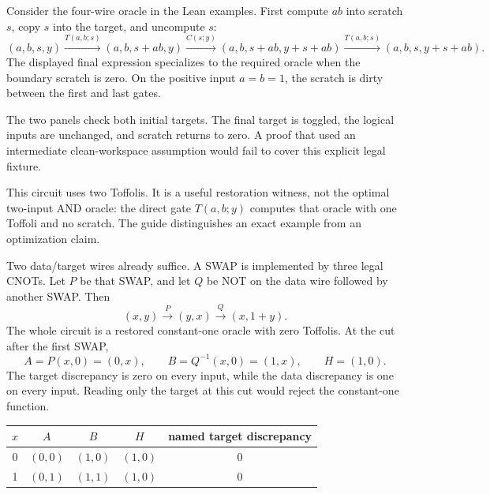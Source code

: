 
Consider the four-wire oracle in the Lean examples. First compute $ab$ into
scratch $s$, copy $s$ into the target, and uncompute $s$:
\[
 (a,b,s,y)\xrightarrow{T(a,b;s)}(a,b,s+ab,y)
 \xrightarrow{C(s;y)}(a,b,s+ab,y+s+ab)
 \xrightarrow{T(a,b;s)}(a,b,s,y+s+ab).
\]
The displayed final expression specializes to the required oracle when
the boundary scratch is zero. On the positive input $a=b=1$, the scratch
is dirty between the first and last gates.


The two panels check both initial targets. The final target is toggled,
the logical inputs are unchanged, and scratch returns to zero. A proof that
used an intermediate clean-workspace assumption would fail to cover this
explicit legal fixture.

This circuit uses two Toffolis. It is a useful restoration witness, not the
optimal two-input AND oracle: the direct gate $T(a,b;y)$ computes that oracle
with one Toffoli and no scratch. The guide distinguishes an exact example
from an optimization claim.


Two data/target wires already suffice. A SWAP is implemented by three legal
CNOTs. Let $P$ be that SWAP, and let $Q$ be NOT on the data wire followed
by another SWAP. Then
\[
 (x,y)\xrightarrow{P}(y,x)
 \xrightarrow{Q}(x,1+y).
\]
The whole circuit is a restored constant-one oracle with zero Toffolis.
At the cut after the first SWAP,
\[
 A=P(x,0)=(0,x),\qquad B=Q^{-1}(x,0)=(1,x),
 \qquad H=(1,0).
\]
The target discrepancy is zero on every input, while the data discrepancy
is one on every input. Reading only the target at this cut would reject
the constant-one function.

\begin{center}
\begin{tabular}{@{}ccccc@{}}\toprule
$x$ & $A$ & $B$ & $H$ & named target discrepancy\\\midrule
0 & $(0,0)$ & $(1,0)$ & $(1,0)$ & 0\\
1 & $(0,1)$ & $(1,1)$ & $(1,0)$ & 0\\\bottomrule
\end{tabular}
\end{center}


